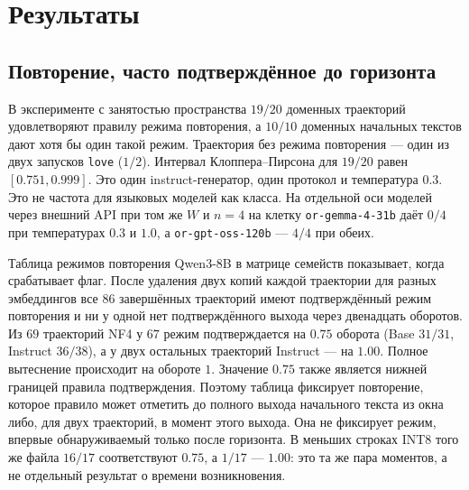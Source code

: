 \documentclass[10pt]{article}
\begin{document}
\section{Результаты}
\label{sec:results}

\subsection{Повторение, часто подтверждённое до горизонта}
\label{sec:repetition}

В эксперименте с занятостью пространства $19/20$ доменных траекторий
удовлетворяют правилу режима повторения, а $10/10$ доменных начальных
текстов дают хотя бы один такой режим. %
Траектория без режима повторения --- один из двух запусков
\texttt{love} ($1/2$). %
Интервал Клоппера--Пирсона для $19/20$ равен $[0.751, 0.999]$. %
Это один instruct-генератор, один протокол и температура $0.3$. %
Это не частота для языковых моделей как класса.
На отдельной оси моделей через внешний API при том же $W$ и $n{=}4$
на клетку \texttt{or-gemma-4-31b} даёт $0/4$ при температурах $0.3$
и $1.0$, а \texttt{or-gpt-oss-120b} --- $4/4$ при обеих. %

Таблица режимов повторения Qwen3-8B в матрице семейств показывает,
когда срабатывает флаг.
После удаления двух копий каждой траектории для разных эмбеддингов
все $86$ завершённых траекторий имеют подтверждённый режим повторения
и ни у одной нет подтверждённого выхода через двенадцать оборотов. %
Из $69$ траекторий NF4 у $67$ режим подтверждается на $0.75$ оборота
(Base $31/31$, Instruct $36/38$), а у двух остальных траекторий
Instruct --- на $1.00$. %
Полное вытеснение происходит на обороте $1$.
Значение $0.75$ также является нижней границей правила подтверждения.
Поэтому таблица фиксирует повторение, которое правило может отметить
до полного выхода начального текста из окна либо, для двух траекторий,
в момент этого выхода.
Она не фиксирует режим, впервые обнаруживаемый только после горизонта.
В меньших строках INT8 того же файла $16/17$ соответствуют $0.75$,
а $1/17$ --- $1.00$: это та же пара моментов, а не отдельный
результат о времени возникновения. %
\end{document}
